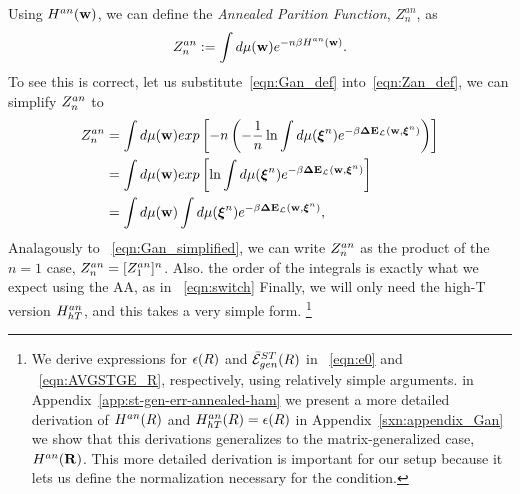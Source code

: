 Using $H^{an}({\mathbf{w}})$, we can define the \emph{Annealed Parition Function}, $Z^{an}_{n}$, as
\begin{align}
  \label{eqn:Zan_def}
  Z^{an}_{n} :=  \int d\mu({\mathbf{w}}) e^{-n\beta H^{an}({\mathbf{w}})}.
\end{align}
To see this is correct, let us substitute~\ref{eqn:Gan_def} into~\ref{eqn:Zan_def}, we can simplify $Z^{an}_{n}$ to
\begin{align}
  \label{eqn:Zan_simple}
  Z^{an}_{n} &=  \int d\mu({\mathbf{w}}) exp\left[-n \left(- \frac{1}{n}\ln  \int d\mu(\boldsymbol{\xi}^{n})e^{-\beta\mathbf{\Delta {E}}_{\mathcal{L}}(\mathbf{w}, \boldsymbol{\xi}^{n})}\right)\right] \\ \nonumber
  &=  \int d\mu({\mathbf{w}}) exp\left[\ln  \int d\mu(\boldsymbol{\xi}^{n})e^{-\beta\mathbf{\Delta {E}}_{\mathcal{L}}(\mathbf{w}, \boldsymbol{\xi}^{n})}\right] \\ \nonumber
  &=  \int d\mu({\mathbf{w}})  \int d\mu(\boldsymbol{\xi}^{n})e^{-\beta\mathbf{\Delta {E}}_{\mathcal{L}}(\mathbf{w}, \boldsymbol{\xi}^{n})} ,
\end{align}
Analagously to \EQN~\ref{eqn:Gan_simplified}, we can write $Z^{an}_{n}$ as the product of the $n=1$ case, $Z^{an}_{n}=[Z^{an}_{1}]^{n}$.
Also. the order of the integrals is exactly what we expect using the AA, as in \EQN~\ref{eqn:switch}
Finally, we will only need the high-T version $H^{an}_{hT}$, and this takes a very simple form.
\footnote{We derive expressions for $\epsilon(R)$ and $\bar{\mathcal{E}}^{ST}_{gen}(R)$ in \EQN~\ref{eqn:e0} and \EQN~\ref{eqn:AVGSTGE_R}, respectively, using relatively simple arguments.
in Appendix~\ref{app:st-gen-err-annealed-ham} we present
a more detailed derivation of $H^{an}(R)$ and $H^{an}_{hT}(R)=\epsilon(R)$
in Appendix~\ref{sxn:appendix_Gan} we show that this derivations generalizes to the matrix-generalized case, $H^{an}(\mathbf{R})$.
This more detailed derivation is important for our \SETOL setup because it lets us define the normalization
necessary for the \TRACELOG condition.
}



